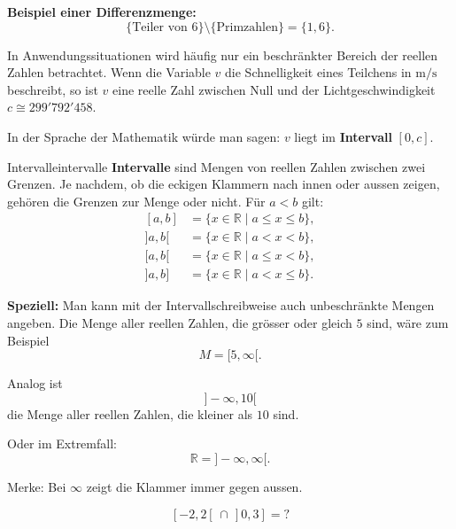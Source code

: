 \textbf{Beispiel einer Differenzmenge:}
\[
    \{\text{Teiler von } 6\}
    \setminus
    \{\text{Primzahlen}\}
    =
    \{1,6\}.
\]

In Anwendungssituationen wird häufig nur ein beschränkter Bereich der reellen Zahlen betrachtet. Wenn die Variable \(v\) die Schnelligkeit eines Teilchens in \(\mathrm{m/s}\) beschreibt, so ist \(v\) eine reelle Zahl zwischen Null und der Lichtgeschwindigkeit \(c \cong 299'792'458\).

In der Sprache der Mathematik würde man sagen: \(v\) liegt im \textbf{Intervall} \([0,c]\).

\begin{definition}{Intervalle}{intervalle}
    \textbf{Intervalle} sind Mengen von reellen Zahlen zwischen zwei Grenzen. Je nachdem, ob die eckigen Klammern nach innen oder aussen zeigen, gehören die Grenzen zur Menge oder nicht. Für \(a<b\) gilt:
    \[
        \begin{aligned}
            [a,b]                                                & = \{x \in \mathbb{R} \mid a \leq x \leq b\}, \\
            ]a,b[                                                & = \{x \in \mathbb{R} \mid a < x < b\},       \\
            [a,b[   &= \{x \in \mathbb{R} \mid a \leq x < b\},\\
                    ]a,b] & = \{x \in \mathbb{R} \mid a < x \leq b\}.
        \end{aligned}
    \]
\end{definition}

\textbf{Speziell:} Man kann mit der Intervallschreibweise auch unbeschränkte Mengen angeben. Die Menge aller reellen Zahlen, die grösser oder gleich \(5\) sind, wäre zum Beispiel
\[
    M = [5,\infty[.
\]

Analog ist
\[
    ]-\infty,10[
\]
die Menge aller reellen Zahlen, die kleiner als \(10\) sind.

Oder im Extremfall:
\[
    \mathbb{R} = ]-\infty,\infty[.
\]

Merke: Bei \(\infty\) zeigt die Klammer immer gegen aussen.

\begin{bsp}
    {}{}
    \[ [-2, 2 [ \, \cap \, ]0, 3] = ? \]
    \vspace*{5 cm}
\end{bsp}







